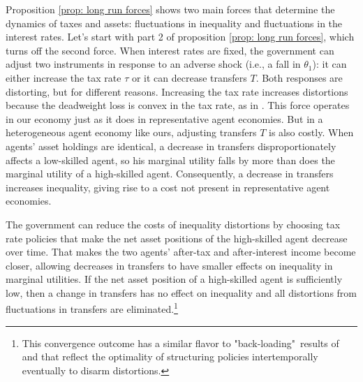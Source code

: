 \documentclass[thmsb,11pt]{article}
\begin{document}
Proposition \ref{prop: long run forces}  shows  two main forces that determine the dynamics of taxes
and assets: fluctuations in inequality and fluctuations in the interest rates. Let's start with part 2 of proposition \ref{prop: long run forces}, which turns off the second force. When  interest rates are fixed, the government can adjust two
instruments in response  to an adverse  shock (i.e., a fall in $\theta_1$): it can either increase the  tax rate $%
\tau $ or it can decrease transfers $T.$ Both  responses are distorting,
but for different reasons. Increasing the tax rate increases distortions because the deadweight loss is convex in the tax rate,
 as in \cite{Barro1979}. This force operates in our economy just as it does in  representative agent economies.
 But in a  heterogeneous agent economy like ours,  adjusting transfers $T$ is
also costly. When agents' asset holdings are identical, a decrease in transfers  disproportionately
affects a low-skilled agent, so his marginal utility
falls by more than does the marginal utility of a high-skilled agent. Consequently, a
decrease in transfers increases inequality, giving rise to a cost  not present in  representative agent economies.

The government can reduce the costs of  inequality distortions by choosing
tax rate policies that make the net asset positions of  the high-skilled agent
decrease over time. That makes the two agents'
after-tax and after-interest income  become closer, allowing decreases in transfers to have smaller effects on inequality in
marginal utilities. If the net asset position of a high-skilled agent is
sufficiently low, then a change in transfers has no effect on inequality and
all  distortions from fluctuations in transfers are eliminated.\footnote{This convergence outcome has
 a similar flavor to "back-loading"\ results  of
 \cite{Ray2002} and \cite{Albanesi2012} that reflect the  optimality of structuring policies intertemporally eventually to disarm  distortions.}




%

\end{document}
